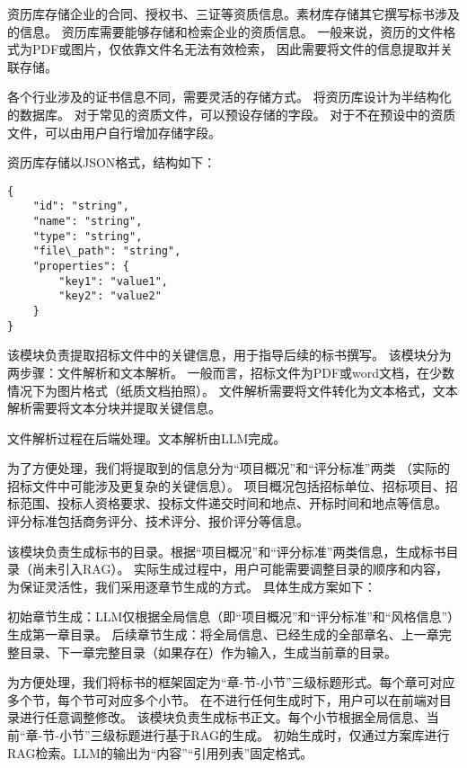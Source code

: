 \documentclass{xmu}
\begin{document}
资历库存储企业的合同、授权书、三证等资质信息。素材库存储其它撰写标书涉及的信息。
资历库需要能够存储和检索企业的资质信息。
一般来说，资历的文件格式为PDF或图片，仅依靠文件名无法有效检索，
因此需要将文件的信息提取并关联存储。

各个行业涉及的证书信息不同，需要灵活的存储方式。
将资历库设计为半结构化的数据库。
对于常见的资质文件，可以预设存储的字段。
对于不在预设中的资质文件，可以由用户自行增加存储字段。

资历库存储以JSON格式，结构如下：

\begin{verbatim}
{
    "id": "string",
    "name": "string",
    "type": "string",
    "file\_path": "string",
    "properties": {
        "key1": "value1",
        "key2": "value2"
    }
}
\end{verbatim}

该模块负责提取招标文件中的关键信息，用于指导后续的标书撰写。
该模块分为两步骤：文件解析和文本解析。
一般而言，招标文件为PDF或word文档，在少数情况下为图片格式（纸质文档拍照）。
文件解析需要将文件转化为文本格式，文本解析需要将文本分块并提取关键信息。

文件解析过程在后端处理。文本解析由LLM完成。

为了方便处理，我们将提取到的信息分为“项目概况”和“评分标准”两类
（实际的招标文件中可能涉及更复杂的关键信息）。
项目概况包括招标单位、招标项目、招标范围、投标人资格要求、投标文件递交时间和地点、开标时间和地点等信息。
评分标准包括商务评分、技术评分、报价评分等信息。

该模块负责生成标书的目录。根据“项目概况”和“评分标准”两类信息，生成标书目录（尚未引入RAG）。
实际生成过程中，用户可能需要调整目录的顺序和内容，为保证灵活性，我们采用逐章节生成的方式。
具体生成方案如下：

初始章节生成：LLM仅根据全局信息（即“项目概况”和“评分标准”和“风格信息”）生成第一章目录。
后续章节生成：将全局信息、已经生成的全部章名、上一章完整目录、下一章完整目录（如果存在）作为输入，生成当前章的目录。

为方便处理，我们将标书的框架固定为“章-节-小节”三级标题形式。每个章可对应多个节，每个节可对应多个小节。
在不进行任何生成时下，用户可以在前端对目录进行任意调整修改。
该模块负责生成标书正文。每个小节根据全局信息、当前“章-节-小节”三级标题进行基于RAG的生成。
初始生成时，仅通过方案库进行RAG检索。LLM的输出为“内容”“引用列表”固定格式。
\end{document}
